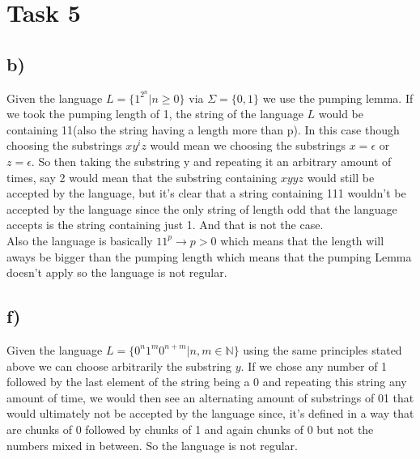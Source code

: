 \chapter{Task 5}
\section{b)}
Given the language $L = \{1^{2^n} | n \geq 0\}$ via $\Sigma = \{0,1\}$ we use the pumping lemma. If we took the pumping length of 1, the string of the language $L$ would be containing  11(also the string having a length more than p). In this case though choosing the substrings $xy^{i}z$ would mean we choosing the substrings $x= \epsilon$ or $z = \epsilon$. So then taking the substring y and repeating it an arbitrary amount of times, say 2 would mean that the substring containing $xyyz$ would still be accepted by the language, but it's clear that a string containing 111 wouldn't be accepted by the language since the only string of length odd that the language accepts is the string containing just 1. And that is not the case.\\
	Also the language is basically $11^p \rightarrow p>0$ which means that the length will aways be bigger than the pumping length which means that the pumping Lemma doesn't apply so the  language is not regular. 
\section{f)}
Given the language $L = \{0^{n}1^{m}0^{n+m} | n, m \in \mathbb{N} \}$ using the same principles stated above we can choose arbitrarily the substring $y$. If we chose any number of 1 followed by the last element of the string being a 0 and repeating this string any amount of time, we would then see an alternating amount of substrings of 01 that would ultimately not be accepted by the language since, it's defined in a way that are chunks of 0 followed by chunks of 1 and again chunks of 0 but not the numbers mixed in between. So the language is not regular.